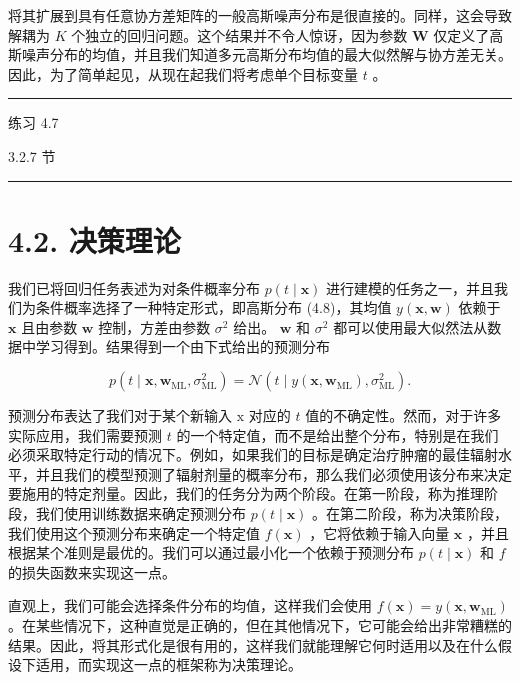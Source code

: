 \documentclass[10pt]{report}
\newcommand{\HRule}{\begin{center}\rule{0.9\linewidth}{0.2mm}\end{center}}
\begin{document}
将其扩展到具有任意协方差矩阵的一般高斯噪声分布是很直接的。同样，这会导致解耦为 \(K\) 个独立的回归问题。这个结果并不令人惊讶，因为参数 \(\mathbf{W}\) 仅定义了高斯噪声分布的均值，并且我们知道多元高斯分布均值的最大似然解与协方差无关。因此，为了简单起见，从现在起我们将考虑单个目标变量 \(t\) 。

\HRule

练习 4.7

3.2.7 节

\HRule

\section*{4.2. 决策理论}

我们已将回归任务表述为对条件概率分布 \(p\left( {t \mid  \mathbf{x}}\right)\) 进行建模的任务之一，并且我们为条件概率选择了一种特定形式，即高斯分布 (4.8)，其均值 \(y\left( {\mathbf{x},\mathbf{w}}\right)\) 依赖于 \(\mathbf{x}\) 且由参数 \(\mathbf{w}\) 控制，方差由参数 \({\sigma }^{2}\) 给出。 \(\mathbf{w}\) 和 \({\sigma }^{2}\) 都可以使用最大似然法从数据中学习得到。结果得到一个由下式给出的预测分布

\[
p\left( {t \mid  \mathbf{x},{\mathbf{w}}_{\mathrm{{ML}}},{\sigma }_{\mathrm{{ML}}}^{2}}\right)  = \mathcal{N}\left( {t \mid  y\left( {\mathbf{x},{\mathbf{w}}_{\mathrm{{ML}}}}\right) ,{\sigma }_{\mathrm{{ML}}}^{2}}\right) . \tag{4.33}
\]

预测分布表达了我们对于某个新输入 \(\mathrm{x}\) 对应的 \(t\) 值的不确定性。然而，对于许多实际应用，我们需要预测 \(t\) 的一个特定值，而不是给出整个分布，特别是在我们必须采取特定行动的情况下。例如，如果我们的目标是确定治疗肿瘤的最佳辐射水平，并且我们的模型预测了辐射剂量的概率分布，那么我们必须使用该分布来决定要施用的特定剂量。因此，我们的任务分为两个阶段。在第一阶段，称为推理阶段，我们使用训练数据来确定预测分布 \(p\left( {t \mid  \mathbf{x}}\right)\) 。在第二阶段，称为决策阶段，我们使用这个预测分布来确定一个特定值 \(f\left( \mathbf{x}\right)\) ，它将依赖于输入向量 \(\mathbf{x}\) ，并且根据某个准则是最优的。我们可以通过最小化一个依赖于预测分布 \(p\left( {t \mid  \mathbf{x}}\right)\) 和 \(f\) 的损失函数来实现这一点。

直观上，我们可能会选择条件分布的均值，这样我们会使用 \(f\left( \mathbf{x}\right)  = y\left( {\mathbf{x},{\mathbf{w}}_{\mathrm{{ML}}}}\right)\) 。在某些情况下，这种直觉是正确的，但在其他情况下，它可能会给出非常糟糕的结果。因此，将其形式化是很有用的，这样我们就能理解它何时适用以及在什么假设下适用，而实现这一点的框架称为决策理论。
\end{document}
